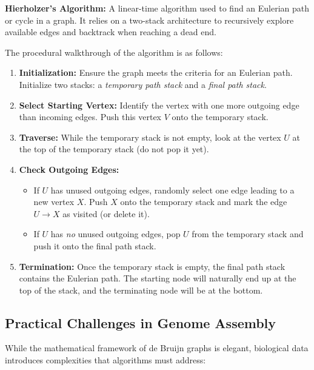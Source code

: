 \documentclass[11pt,a4paper]{article}
\newenvironment{important}{%
    \begin{tcolorbox}[colback=blue!5, colframe=blue!80!black, arc=4mm, boxrule=1pt]
}{%
    \end{tcolorbox}
}
\begin{document}
\begin{important}
    \textbf{Hierholzer's Algorithm:} A linear-time algorithm used to find an Eulerian path or cycle in a graph. It relies on a two-stack architecture to recursively explore available edges and backtrack when reaching a dead end.
\end{important}

The procedural walkthrough of the algorithm is as follows:
\begin{enumerate}
    \item \textbf{Initialization:} Ensure the graph meets the criteria for an Eulerian path. Initialize two stacks: a \textit{temporary path stack} and a \textit{final path stack}.
    \item \textbf{Select Starting Vertex:} Identify the vertex with one more outgoing edge than incoming edges. Push this vertex $V$ onto the temporary stack.
    \item \textbf{Traverse:} While the temporary stack is not empty, look at the vertex $U$ at the top of the temporary stack (do not pop it yet).
    \item \textbf{Check Outgoing Edges:} 
    \begin{itemize}
        \item If $U$ has unused outgoing edges, randomly select one edge leading to a new vertex $X$. Push $X$ onto the temporary stack and mark the edge $U \to X$ as visited (or delete it).
        \item If $U$ has \textit{no} unused outgoing edges, pop $U$ from the temporary stack and push it onto the final path stack.
    \end{itemize}
    \item \textbf{Termination:} Once the temporary stack is empty, the final path stack contains the Eulerian path. The starting node will naturally end up at the top of the stack, and the terminating node will be at the bottom.
\end{enumerate}

\subsection{Practical Challenges in Genome Assembly}
While the mathematical framework of de Bruijn graphs is elegant, biological data introduces complexities that algorithms must address:
\end{document}
